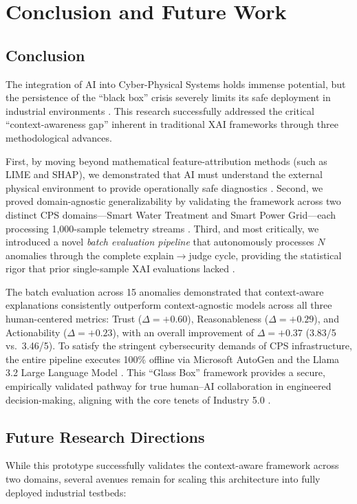 \documentclass[a4paper,fleqn]{cas-dc}
\begin{document}
\section{Conclusion and Future Work}

\subsection{Conclusion}
The integration of AI into Cyber-Physical Systems holds immense potential, but the persistence of the ``black box'' crisis severely limits its safe deployment in industrial environments \cite{ref12, ref13}. This research successfully addressed the critical ``context-awareness gap'' inherent in traditional XAI frameworks through three methodological advances.

First, by moving beyond mathematical feature-attribution methods (such as LIME and SHAP), we demonstrated that AI must understand the external physical environment to provide operationally safe diagnostics \cite{ref16, ref26}. Second, we proved domain-agnostic generalizability by validating the framework across two distinct CPS domains---Smart Water Treatment and Smart Power Grid---each processing 1,000-sample telemetry streams \cite{ref4}. Third, and most critically, we introduced a novel \textit{batch evaluation pipeline} that autonomously processes $N$ anomalies through the complete explain$\rightarrow$judge cycle, providing the statistical rigor that prior single-sample XAI evaluations lacked \cite{ref_batch_eval, ref_llm_judge}.

The batch evaluation across 15 anomalies demonstrated that context-aware explanations consistently outperform context-agnostic models across all three human-centered metrics: Trust ($\Delta = +0.60$), Reasonableness ($\Delta = +0.29$), and Actionability ($\Delta = +0.23$), with an overall improvement of $\Delta = +0.37$ (3.83/5 vs.\ 3.46/5). To satisfy the stringent cybersecurity demands of CPS infrastructure, the entire pipeline executes 100\% offline via Microsoft AutoGen \cite{ref_autogen} and the Llama 3.2 Large Language Model \cite{ref_llama}. This ``Glass Box'' framework provides a secure, empirically validated pathway for true human--AI collaboration in engineered decision-making, aligning with the core tenets of Industry 5.0 \cite{ref38}.

\subsection{Future Research Directions}
While this prototype successfully validates the context-aware framework across two domains, several avenues remain for scaling this architecture into fully deployed industrial testbeds:
\end{document}
